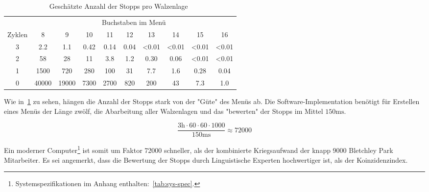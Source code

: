 \begin{table}[htbp]
	\centering
	\caption{Geschätzte Anzahl der Stopps pro Walzenlage~\autocite{enwiki:bombe}}
	\label{tab:num-stops}
	\begin{tabular}{|c||c|c|c|c|c|c|c|c|c|}
		\hline
		                                    &              \multicolumn{9}{c|}{Buchstaben im Menü}               \\ 
		              Zyklen                &   8   &   9   &  10  &  11  &  12  &  13   &  14   &  15   &  16   \\
		\hhline{|=||=|=|=|=|=|=|=|=|=|}
						 3 					&  2.2  &  1.1  & 0.42 & 0.14 & 0.04 & <0.01 & <0.01 & <0.01 & <0.01 \\ \hline
		                 2                  &  58   &  28   &  11  & 3.8  & 1.2  & 0.30  & 0.06  & <0.01 & <0.01 \\ \hline
		                 1                  & 1500  &  720  & 280  & 100  &  31  &  7.7  &  1.6  & 0.28  & 0.04  \\ \hline
		                 0                  & 40000 & 19000 & 7300 & 2700 & 820  &  200  &  43   &  7.3  &  1.0  \\ \hline
	\end{tabular}
\end{table}


Wie in~\cref{tab:num-stops} zu sehen, hängen die Anzahl der Stopps stark von der "Güte" des Menüs ab.
Die Software-Implementation benötigt für Erstellen eines Menüs der Länge zwölf, die Abarbeitung aller Walzenlagen und das "bewerten" der Stopps im Mittel
$150\si{\ms}$.

\[
\frac{3\si{\hour} \cdot 60 \cdot 60 \cdot 1000}{150\si{\ms}} \approx 72000
\]

Ein moderner Computer\footnote{Systemspezifikationen im Anhang enthalten:~\cref{tab:sys-spec}.} ist somit um Faktor 72000 schneller, als der kombinierte Kriegsaufwand der knapp 9000 Bletchley Park Mitarbeiter.
Es sei angemerkt, dass die Bewertung der Stopps durch Linguistische Experten hochwertiger ist, als der Koinzidenzindex.
